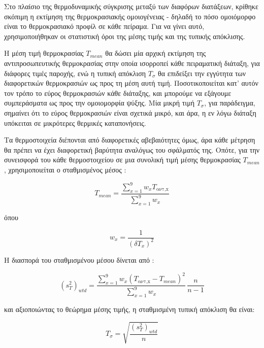 \noindent Στο πλαίσιο της θερμοδυναμικής σύγκρισης μεταξύ των διαφόρων διατάξεων, κρίθηκε σκόπιμη η εκτίμηση της θερμοκρασιακής ομοιογένειας - δηλαδή το πόσο ομοιόμορφο είναι το θερμοκρασιακό προφίλ σε κάθε πείραμα. Για να γίνει αυτό, χρησιμοποιήθηκαν οι στατιστική όροι της μέσης τιμής και της τυπικής απόκλισης.

Η μέση τιμή θερμοκρασίας $Τ_{mean}$ θα δώσει μία αρχική εκτίμηση της αντιπροσωπευτικής θερμοκρασίας στην οποία ισορροπεί κάθε πειραματική διάταξη, για διάφορες τιμές παροχής, ενώ η τυπική απόκλιση $T_{\sigma}$  θα επιδείξει την εγγύτητα των διαφορετικών θερμοκρασιών ως προς τη μέση αυτή τιμή. Ποσοτικοποιείται κατ' αυτόν τον τρόπο το εύρος θερμοκρασιών κάθε διάταξης, και μπορούμε να εξάγουμε συμπεράσματα ως προς την ομοιομορφία ψύξης. Μία μικρή τιμή $T_{\sigma}$, για παράδειγμα, σημαίνει ότι το εύρος θερμοκρασιών είναι σχετικά μικρό, και άρα, η εν λόγω διάταξη υπόκειται σε μικρότερες θερμικές καταπονήσεις.

Τα θερμοστοιχεία διέπονται από διαφορετικές αβεβαιότητες όμως, άρα κάθε μέτρηση θα πρέπει να έχει διαφορετική βαρύτητα αναλόγως του σφάλματός της. Οπότε, για την συνεισφορά του κάθε θερμοστοιχείου σε μια συνολική τιμή μέσης θερμοκρασίας $T_{mean}$, χρησιμοποιείται ο σταθμισμένος μέσος \parencites{1997_Taylor_BOOK}{2006_James_BOOK}:

\begin{equation}\label{eq:wmeantemp}
T_{mean} = \displaystyle\frac{\displaystyle\sum_{x=1}^{9} w_x T_{\text{αντ,x}}}{\displaystyle\sum_{x=1}^{9} w_x}
\end{equation}

\noindent όπου

\begin{equation*}
w_x = \displaystyle\frac{1}{\left(\delta T_x\right)^2}
\end{equation*}

\noindent Η διασπορά του σταθμισμένου μέσου δίνεται από \parencites{2003_Bevington_BOOK}{Kirchner2006}:

\begin{equation}\label{eq:varwmean}
\left(s_T ^2 \right)_{wtd} = \displaystyle\frac{\displaystyle\sum_{x=1}^{9} w_x \left(T_{\text{αντ,x}} - T_{mean}\right)^2}{\displaystyle\sum_{x = 1}^{9} w_x} \, \displaystyle\frac{n}{n-1}
\end{equation}

\noindent και αξιοποιώντας το θεώρημα μέσης τιμής, η σταθμισμένη τυπική απόκλιση θα είναι:

\begin{equation}\label{eq:errorwmean}
T_{\sigma} = \displaystyle\sqrt{\frac{\left(s_T ^2 \right)_{wtd}}{n}}
\end{equation}

